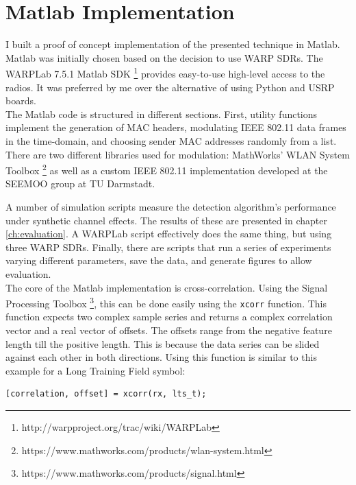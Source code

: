 
\section{Matlab Implementation}\label{sec:matlab-impl}

I built a proof of concept implementation of the presented technique in Matlab. Matlab was initially chosen based on the decision to use \gls{WARP} \glspl{SDR}. The WARPLab 7.5.1 Matlab \gls{SDK} \footnote{http://warpproject.org/trac/wiki/WARPLab} provides easy-to-use high-level access to the radios. It was preferred by me over the alternative of using Python and \gls{USRP} boards.\\

The Matlab code is structured in different sections. First, utility functions implement the generation of MAC headers, modulating IEEE 802.11 data frames in the time-domain, and choosing sender MAC addresses randomly from a list. There are two different libraries used for modulation: MathWorks' WLAN System Toolbox \footnote{https://www.mathworks.com/products/wlan-system.html} as well as a custom IEEE 802.11 implementation developed at the \gls{SEEMOO} group at TU Darmstadt.

A number of simulation scripts measure the detection algorithm's performance under synthetic channel effects. The results of these are presented in chapter \ref{ch:evaluation}. A WARPLab script effectively does the same thing, but using three \gls{WARP} \glspl{SDR}. Finally, there are scripts that run a series of experiments varying different parameters, save the data, and generate figures to allow evaluation.\\

The core of the Matlab implementation is cross-correlation. Using the Signal Processing Toolbox \footnote{https://www.mathworks.com/products/signal.html}, this can be done easily using the \texttt{xcorr} function. This function expects two complex sample series and returns a complex correlation vector and a real vector of offsets. The offsets range from the negative feature length till the positive length. This is because the data series can be slided against each other in both directions. Using this function is similar to this example for a Long Training Field symbol:\\

\begin{lstlisting}[captionpos=b,caption={Cross-Correlation of LTF Symbol},label=lst:xcorr]
[correlation, offset] = xcorr(rx, lts_t);
\end{lstlisting}

